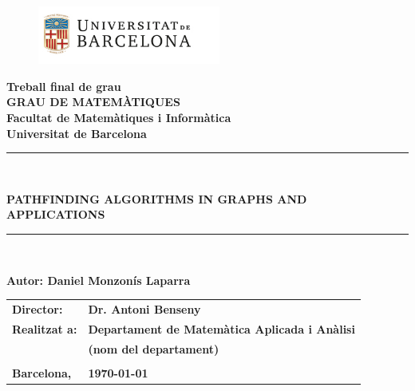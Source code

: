 \documentclass[a4paper,10pt]{report}
\begin{document}
\pagestyle{empty}

\begin{titlepage}
\begin{center}
\begin{figure}[htb]
\begin{center}
\includegraphics[width=6cm]{ub.png}
\end{center}
\end{figure}

\textbf{\LARGE Treball final de grau} \\
\vspace*{.5cm}
\textbf{\LARGE GRAU DE MATEMÀTIQUES } \\
\vspace*{.5cm}
\textbf{\LARGE Facultat de Matemàtiques i Informàtica \\ Universitat de Barcelona} \\
\vspace*{1.5cm}
\rule{16cm}{0.1mm}\\
\begin{Huge}
\textbf{PATHFINDING ALGORITHMS IN GRAPHS AND APPLICATIONS} \\
\end{Huge}
\rule{16cm}{0.1mm}\\

\vspace{1cm}

\begin{flushright}
\textbf{\LARGE Autor: Daniel Monzonís Laparra}

\vspace*{2cm}

\renewcommand{\arraystretch}{1.5}
\begin{tabular}{ll}
\textbf{\Large Director:} & \textbf{\Large Dr. Antoni Benseny} \\
\textbf{\Large Realitzat a:} & \textbf{\Large  Departament de Matemàtica Aplicada i Anàlisi} \\
 & \textbf{\Large (nom del departament)} \\
\\
\textbf{\Large Barcelona,} & \textbf{\Large \today }
\end{tabular}

\end{flushright}
\end{center}
\end{titlepage}
\end{document}
